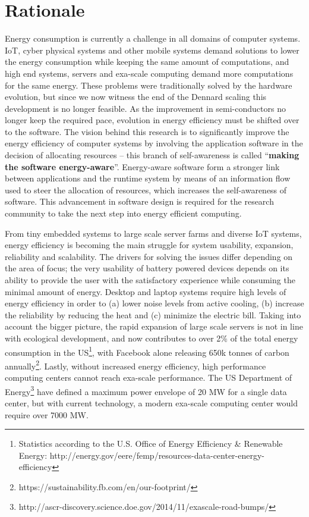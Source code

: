 \documentclass{article}
\begin{document}
\section{Rationale}
Energy consumption is currently a challenge in all domains of computer systems.
IoT, cyber physical systems and other mobile systems demand solutions to lower the energy consumption while keeping the same amount of computations,
and high end systems, servers and exa-scale computing demand more computations for the same energy.
These problems were traditionally solved by the hardware evolution, but since we now witness the end of the Dennard scaling \cite{Dennard:74} this development is no longer feasible.
As the improvement in semi-conductors no longer keep the required pace, evolution in energy efficiency must be shifted over to the software.
The vision behind this research is to significantly improve the energy efficiency of computer systems by involving the application software in the decision of allocating resources -- this branch of self-awareness is called ``\textbf{making the software energy-aware}''.
Energy-aware software form a stronger link between applications and the runtime system by means of an information flow used to steer the allocation of resources,
which increases the self-awareness of software. This advancement in software design is required for the research community to take the next step into energy efficient computing.\smallskip

From tiny embedded systems to large scale server farms and diverse IoT systems, energy efficiency is becoming the main struggle for system usability, expansion, reliability and scalability.
The drivers for solving the issues differ depending on the area of focus;
the very usability of battery powered devices depends on its ability to provide the user with the satisfactory experience while consuming the minimal amount of energy.
Desktop and laptop systems require high levels of energy efficiency in order to (a) lower noise levels from active cooling, (b) increase the reliability by reducing the heat and (c) minimize the electric bill.
Taking into account the bigger picture, the rapid expansion of large scale servers is not in line with ecological development, and now contributes to over 2\% of the total energy consumption in the US\footnote{Statistics according to the U.S. Office of Energy Efficiency \& Renewable Energy: http://energy.gov/eere/femp/resources-data-center-energy-efficiency}, with Facebook alone releasing 650k tonnes of carbon annually\footnote{https://sustainability.fb.com/en/our-footprint/}.
Lastly, without increased energy efficiency, high performance computing centers cannot reach exa-scale performance.
The US Department of Energy\footnote{http://ascr-discovery.science.doe.gov/2014/11/exascale-road-bumps/} have defined a maximum power envelope of 20 MW for a single data center, but with current technology, a modern exa-scale computing center would require over 7000 MW.\smallskip
\end{document}
